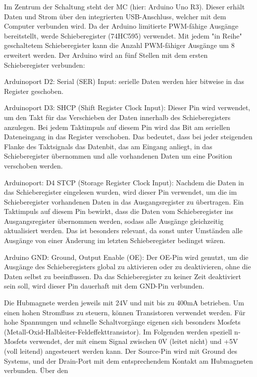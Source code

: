 \documentclass[11pt]{article}
\begin{document}
Im Zentrum der Schaltung steht der \ac{MC} (hier: Arduino Uno R3).
Dieser erhält Daten und Strom über den integrierten USB-Anschluss, welcher mit dem Computer verbunden wird.
Da der Arduino limitierte PWM-fähige Ausgänge bereitstellt, werde Schieberegister (74HC595) verwendet.
Mit jedem "in Reihe" geschaltetem Schieberegister kann die Anzahl PWM-fähiger Ausgänge um 8 erweitert werden.
Der Arduino wird an fünf Stellen mit dem ersten Schieberegister verbunden:

Arduinoport D2:
Serial (SER) Input: serielle Daten werden hier bitweise in das Register geschoben.

Arduinoport D3:
SHCP (Shift Register Clock Input): Dieser Pin wird verwendet, um den Takt für das Verschieben der Daten innerhalb des Schieberegisters anzulegen.
Bei jedem Taktimpuls auf diesem Pin wird das Bit am seriellen Dateneingang in das Register verschoben.
Das bedeutet, dass bei jeder steigenden Flanke des Taktsignals das Datenbit, das am Eingang anliegt, in das Schieberegister übernommen und alle vorhandenen Daten um eine Position verschoben werden.

Arduinoport: D4
STCP (Storage Register Clock Input): Nachdem die Daten in das Schieberegister eingelesen wurden, wird dieser Pin verwendet, um die im Schieberegister vorhandenen Daten in das Ausgangsregister zu übertragen.
Ein Taktimpuls auf diesem Pin bewirkt, dass die Daten vom Schieberegister ins Ausgangsregister übernommen werden, sodass alle Ausgänge gleichzeitig aktualisiert werden.
Das ist besonders relevant, da sonst unter Umständen alle Ausgänge von einer Änderung im letzten Schieberegister bedingst wären.

Arduino GND:
Ground, Output Enable (OE): Der OE-Pin wird genutzt, um die Ausgänge des Schieberegisters global zu aktivieren oder zu deaktivieren, ohne die Daten selbst zu beeinflussen.
Da das Schieberegister zu keiner Zeit deaktiviert sein soll, wird dieser Pin dauerhaft mit dem GND-Pin verbunden.



Die Hubmagnete werden jeweils mit 24V und mit bis zu 400mA betrieben.
Um einen hohen Stromfluss zu steuern, können Transistoren verwendet werden.
Für hohe Spannungen und schnelle Schaltvorgänge eigenen sich besonders Mosfets (Metall-Oxid-Halbleiter-Feldeffekttransistor).
Im Folgenden werden speziell n-Mosfets verwendet, der mit einem Signal zwischen 0V (leitet nicht) und +5V (voll leitend) angesteuert werden kann.
\n
    Der Source-Pin wird mit Ground des Systems, und der Drain-Port mit dem entsprechendem Kontakt am Hubmagneten verbunden.
    Über den
\end{document}
